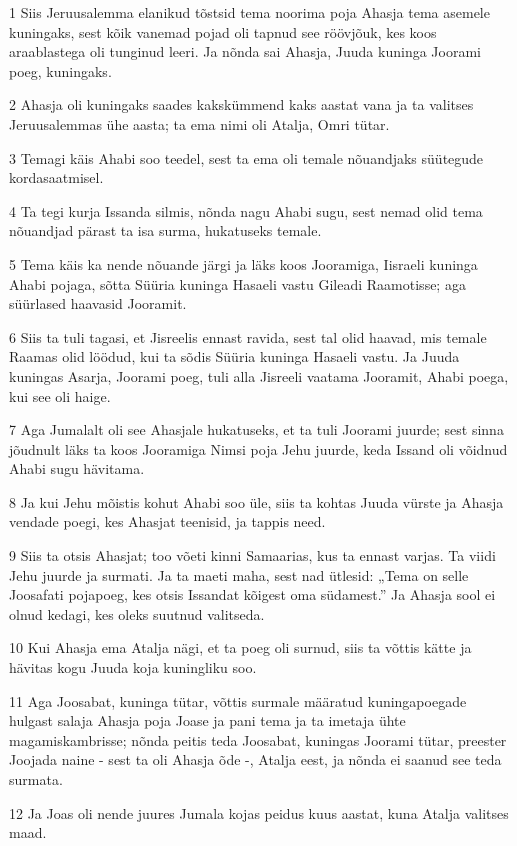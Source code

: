 \par 1 Siis Jeruusalemma elanikud tõstsid tema noorima poja Ahasja tema asemele kuningaks, sest kõik vanemad pojad oli tapnud see röövjõuk, kes koos araablastega oli tunginud leeri. Ja nõnda sai Ahasja, Juuda kuninga Joorami poeg, kuningaks.
\par 2 Ahasja oli kuningaks saades kakskümmend kaks aastat vana ja ta valitses Jeruusalemmas ühe aasta; ta ema nimi oli Atalja, Omri tütar.
\par 3 Temagi käis Ahabi soo teedel, sest ta ema oli temale nõuandjaks süütegude kordasaatmisel.
\par 4 Ta tegi kurja Issanda silmis, nõnda nagu Ahabi sugu, sest nemad olid tema nõuandjad pärast ta isa surma, hukatuseks temale.
\par 5 Tema käis ka nende nõuande järgi ja läks koos Jooramiga, Iisraeli kuninga Ahabi pojaga, sõtta Süüria kuninga Hasaeli vastu Gileadi Raamotisse; aga süürlased haavasid Jooramit.
\par 6 Siis ta tuli tagasi, et Jisreelis ennast ravida, sest tal olid haavad, mis temale Raamas olid löödud, kui ta sõdis Süüria kuninga Hasaeli vastu. Ja Juuda kuningas Asarja, Joorami poeg, tuli alla Jisreeli vaatama Jooramit, Ahabi poega, kui see oli haige.
\par 7 Aga Jumalalt oli see Ahasjale hukatuseks, et ta tuli Joorami juurde; sest sinna jõudnult läks ta koos Jooramiga Nimsi poja Jehu juurde, keda Issand oli võidnud Ahabi sugu hävitama.
\par 8 Ja kui Jehu mõistis kohut Ahabi soo üle, siis ta kohtas Juuda vürste ja Ahasja vendade poegi, kes Ahasjat teenisid, ja tappis need.
\par 9 Siis ta otsis Ahasjat; too võeti kinni Samaarias, kus ta ennast varjas. Ta viidi Jehu juurde ja surmati. Ja ta maeti maha, sest nad ütlesid: „Tema on selle Joosafati pojapoeg, kes otsis Issandat kõigest oma südamest.” Ja Ahasja sool ei olnud kedagi, kes oleks suutnud valitseda.
\par 10 Kui Ahasja ema Atalja nägi, et ta poeg oli surnud, siis ta võttis kätte ja hävitas kogu Juuda koja kuningliku soo.
\par 11 Aga Joosabat, kuninga tütar, võttis surmale määratud kuningapoegade hulgast salaja Ahasja poja Joase ja pani tema ja ta imetaja ühte magamiskambrisse; nõnda peitis teda Joosabat, kuningas Joorami tütar, preester Joojada naine - sest ta oli Ahasja õde -, Atalja eest, ja nõnda ei saanud see teda surmata.
\par 12 Ja Joas oli nende juures Jumala kojas peidus kuus aastat, kuna Atalja valitses maad.

